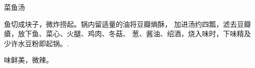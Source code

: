 \begin{recipe}{菜鱼汤}

\ingredients


\cooking

鱼切成块子，微炸捞起。锅内留适量的油将豆瓣熵酥， 加进汤约四瓢，滤去豆瓣瘡，放下鱼、菜心、火腿、鸡肉、冬菇、 葱、酱油、绍酒，烧入味时，下味精及少许水豆粉即起锅。.

\notes

味鲜美，微辣。

\end{recipe}

